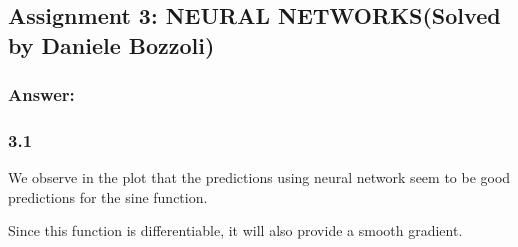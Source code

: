 \documentclass[
]{article}
\begin{document}
\subsection{Assignment 3: NEURAL NETWORKS(Solved by Daniele
Bozzoli)}\label{assignment-3-neural-networkssolved-by-daniele-bozzoli}

\subsubsection{Answer:}\label{answer-2}

\subsubsection{3.1}\label{section}

We observe in the plot that the predictions using neural network seem to
be good predictions for the sine function.

Since this function is differentiable, it will also provide a smooth
gradient.
\end{document}
